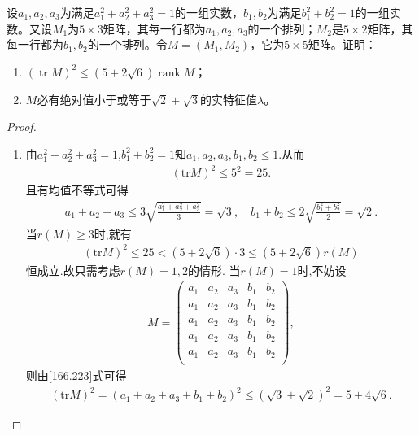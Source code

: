 \documentclass[../../main.tex]{subfiles}%
\begin{document}
\begin{example}
设$a_1,a_2,a_3$为满足$a_1^2 + a_2^2 + a_3^2 = 1$的一组实数，$b_1,b_2$为满足$b_1^2 + b_2^2 = 1$的一组实数。又设$M_1$为$5 \times 3$矩阵，其每一行都为$a_1,a_2,a_3$的一个排列；$M_2$是$5 \times 2$矩阵，其每一行都为$b_1,b_2$的一个排列。令$M = (M_1,M_2)$，它为$5 \times 5$矩阵。证明：
\begin{enumerate}[(1)]
\item $(\operatorname{tr} M)^2 \leqslant (5 + 2\sqrt{6})\operatorname{rank} M$；

\item $M$必有绝对值小于或等于$\sqrt{2} + \sqrt{3}$的实特征值$\lambda$。
\end{enumerate}
\end{example}
\begin{proof}
\begin{enumerate}[(1)]
\item 由$a_{1}^{2}+a_{2}^{2}+a_{3}^{2}=1$,$b_{1}^{2}+b_{2}^{2}=1$知$a_1,a_2,a_3,b_1,b_2\leqslant 1$.从而
\begin{align*}
\left( \mathrm{tr}M \right) ^2\leqslant 5^2=25.
\end{align*}
且有均值不等式可得
\begin{align}
a_1+a_2+a_3\leqslant 3\sqrt{\frac{a_{1}^{2}+a_{2}^{2}+a_{3}^{2}}{3}}=\sqrt{3},\quad b_1+b_2\leqslant 2\sqrt{\frac{b_{1}^{2}+b_{2}^{2}}{2}}=\sqrt{2}.\label{166.223}
\end{align}
当$r\left( M \right) \geqslant 3$时,就有
\begin{align*}
\left( \mathrm{tr}M \right) ^2\leqslant 25<\left( 5+2\sqrt{6} \right) \cdot 3\leqslant \left( 5+2\sqrt{6} \right) r\left( M \right)
\end{align*}
恒成立.故只需考虑$r\left( M \right) =1,2$的情形.
当$r\left( M \right) =1$时,不妨设
\begin{align*}
M=\begin{pmatrix}
a_1&	a_2&	a_3&	b_1&	b_2\\
a_1&	a_2&	a_3&	b_1&	b_2\\
a_1&	a_2&	a_3&	b_1&	b_2\\
a_1&	a_2&	a_3&	b_1&	b_2\\
a_1&	a_2&	a_3&	b_1&	b_2\\
\end{pmatrix},
\end{align*}
则由\eqref{166.223}式可得
\begin{align*}
\left( \mathrm{tr}M \right) ^2=\left( a_1+a_2+a_3+b_1+b_2 \right) ^2\leqslant \left( \sqrt{3}+\sqrt{2} \right) ^2=5+4\sqrt{6}.

\end{align*}
\end{enumerate}
\end{proof}
\end{document}
